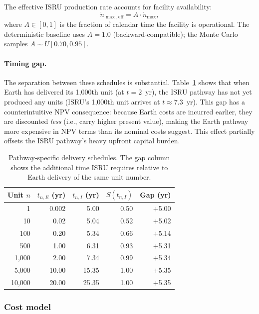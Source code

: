 \documentclass[preprint,12pt]{elsarticle}
\begin{document}
The effective ISRU production rate accounts for facility availability:
\begin{equation}
  \dot{n}_{\max,\mathrm{eff}} = A \cdot \dot{n}_{\max},
  \label{eq:availability}
\end{equation}
where $A \in [0,1]$ is the fraction of calendar time the facility is operational. The deterministic baseline uses $A = 1.0$ (backward-compatible); the Monte Carlo samples $A \sim U[0.70, 0.95]$.

\paragraph{Timing gap.} The separation between these schedules is substantial. Table~\ref{tab:production_schedule} shows that when Earth has delivered its 1{,}000th unit (at $t = 2$~yr), the ISRU pathway has not yet produced any units (ISRU's 1{,}000th unit arrives at $t \approx 7.3$~yr). This gap has a counterintuitive NPV consequence: because Earth costs are incurred earlier, they are discounted \emph{less} (i.e., carry higher present value), making the Earth pathway more expensive in NPV terms than its nominal costs suggest. This effect partially offsets the ISRU pathway's heavy upfront capital burden.

\begin{table}[htbp]
\centering
\caption{Pathway-specific delivery schedules. The gap column shows the additional time ISRU requires relative to Earth delivery of the same unit number.}
\label{tab:production_schedule}
\small
\begin{tabular}{@{}rrrrr@{}}
\toprule
Unit $n$ & $t_{n,E}$ (yr) & $t_{n,I}$ (yr) & $S(t_{n,I})$ & Gap (yr) \\
\midrule
1      & 0.002 & 5.00  & 0.50 & $+$5.00 \\
10     & 0.02  & 5.04  & 0.52 & $+$5.02 \\
100    & 0.20  & 5.34  & 0.66 & $+$5.14 \\
500    & 1.00  & 6.31  & 0.93 & $+$5.31 \\
1{,}000  & 2.00  & 7.34  & 0.99 & $+$5.34 \\
5{,}000  & 10.00 & 15.35 & 1.00 & $+$5.35 \\
10{,}000 & 20.00 & 25.35 & 1.00 & $+$5.35 \\
\bottomrule
\end{tabular}
\end{table}

\subsubsection{Cost model}
\end{document}
